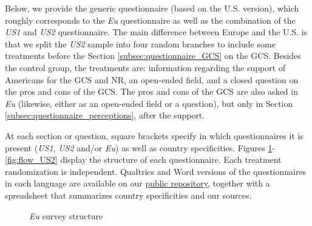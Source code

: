 Below, we provide the generic questionnaire (based on the U.S. version), which roughly corresponds to the \textit{Eu} questionnaire as well as the combination of the \textit{US1} and \textit{US2} questionnaire. The main difference between Europe and the U.S. is that we split the \textit{US2} sample into four random branches to include some treatments before the Section \ref{subsec:questionnaire_GCS} on the GCS. Besides the control group, the treatments are: information regarding the support of Americans for the GCS and NR, an open-ended field, and a closed question on the pros and cons of the GCS. The pros and cons of the GCS are also asked in \textit{Eu} (likewise, either as an open-ended field or a question), but only in Section \ref{subsec:questionnaire_perceptions}, after the support. 

At each section or question, square brackets specify in which questionnaires it is present (\textit{US1}, \textit{US2} and/or \textit{Eu}) as well as country specificities. Figures \ref{fig:flow_Eu}-\ref{fig:flow_US2} display the structure of each questionnaire. Each treatment randomization is independent. Qualtrics and Word versions of the questionnaires in each language are available on our \href{https://github.com/bixiou/international_attitudes_toward_global_policies/tree/main/questionnaire}{public repository}, together with a spreadsheet that summarizes country specificities and our sources.

\begin{figure}[h!]
    \caption{\textit{Eu} survey structure}\label{fig:flow_Eu}
\end{figure}

